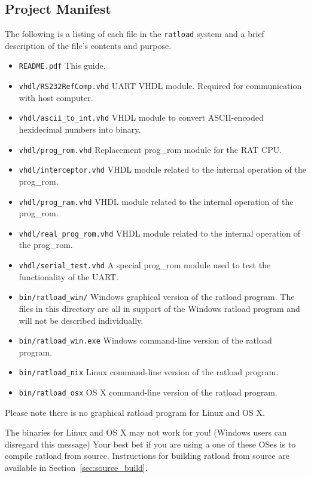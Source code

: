 \documentclass[notitlepage]{article}
\newcommand{\infosign}{\fontencoding{U}\fontfamily{futs}\huge\selectfont\char 116\relax}
\begin{document}
\subsection{Project Manifest}
The following is a listing of each file in the \texttt{ratload} system and a brief description of the file's contents and purpose.
\begin{itemize}
\item \texttt{README.pdf} This guide.
\item \texttt{vhdl/RS232RefComp.vhd} UART VHDL module. Required for communication with host computer.
\item \texttt{vhdl/ascii\_to\_int.vhd} VHDL module to convert ASCII-encoded hexidecimal numbers into binary.
\item \texttt{vhdl/prog\_rom.vhd} Replacement prog\_rom module for the RAT CPU.
\item \texttt{vhdl/interceptor.vhd} VHDL module related to the internal operation of the prog\_rom.
\item \texttt{vhdl/prog\_ram.vhd} VHDL module related to the internal operation of the prog\_rom.
\item \texttt{vhdl/real\_prog\_rom.vhd} VHDL module related to the internal operation of the prog\_rom.
\item \texttt{vhdl/serial\_test.vhd} A special prog\_rom module used to test the functionality of the UART.
\item \texttt{bin/ratload\_win/} Windows graphical version of the ratload program. The files in this directory are all in support of the Windows ratload program and will not be described individually.
\item \texttt{bin/ratload\_win.exe} Windows command-line version of the ratload program.
\item \texttt{bin/ratload\_nix} Linux command-line version of the ratload program. 
\item \texttt{bin/ratload\_osx} OS X command-line version of the ratload program.
\end{itemize}
Please note there is no graphical ratload program for Linux and OS X.

\begin{infobox}
  {\infosign} The binaries for Linux and OS X may not work for you! (Windows users can disregard this message) Your best bet if you are using a one of these OSes is to compile ratload from source. Instructions for building ratload from source are available in Section~\ref{sec:source_build}.
\end{infobox}
\end{document}
